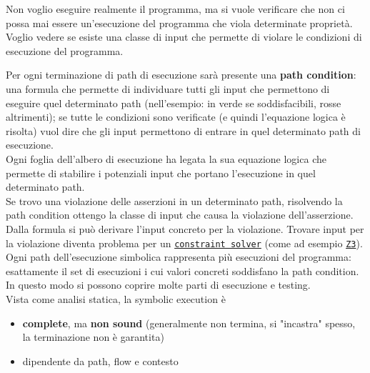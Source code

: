 \begin{center}
	
\end{center}

Non voglio eseguire realmente il programma, ma si vuole verificare che non ci possa mai essere un'esecuzione del programma che viola determinate proprietà. Voglio vedere se esiste una classe di input che permette di violare le condizioni di esecuzione del programma.\\

\newpage

Per ogni terminazione di path di esecuzione sarà presente una \textbf{path condition}: una formula che permette di individuare tutti gli input che permettono di eseguire quel determinato path (nell'esempio: in verde se soddisfacibili, rosse altrimenti); se tutte le condizioni sono verificate (e quindi l'equazione logica è risolta) vuol dire che gli input permettono di entrare in quel determinato path di esecuzione.\\

Ogni foglia dell'albero di esecuzione ha legata la sua equazione logica che permette di stabilire i potenziali input che portano l'esecuzione in quel determinato path.\\

Se trovo una violazione delle asserzioni in un determinato path, risolvendo la path condition ottengo la classe di input che causa la violazione dell'asserzione. Dalla formula si può derivare l'input concreto per la violazione. Trovare input per la violazione diventa problema per un \href{https://en.wikipedia.org/wiki/Constraint_programming}{\texttt{constraint solver}} (come ad esempio \href{https://github.com/z3prover/z3}{\texttt{Z3}}).\\

Ogni path dell'esecuzione simbolica rappresenta più esecuzioni del programma: esattamente il set di esecuzioni i cui valori concreti soddisfano la path condition. In questo modo si possono coprire molte parti di esecuzione e testing.\\

Vista come analisi statica, la symbolic execution è
\begin{itemize}
	\item \textbf{complete}, ma \textbf{non sound} (generalmente non termina, si "incastra" spesso, la terminazione non è garantita)
	\item dipendente da path, flow e contesto
\end{itemize}

